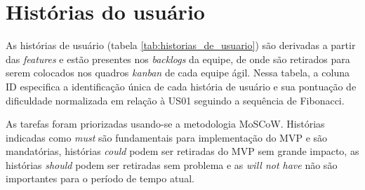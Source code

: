 \documentclass[
	12pt,				%
	oneside,			%
	a4paper,			%
	english,			%
	brazil,				%
	]{abntex2}
\begin{document}
\section{Histórias do usuário}
As histórias de usuário (tabela \ref{tab:historias_de_usuario}) são derivadas a partir das \foreignlanguage{english}{\textit{features}} e estão presentes nos \foreignlanguage{english}{\textit{backlogs}} da equipe, de onde são retirados para serem colocados nos quadros \textit{kanban} de cada equipe ágil. Nessa tabela, a coluna ID especifica a identificação única de cada história de usuário e sua pontuação de dificuldade normalizada em relação à US01 seguindo a sequência de Fibonacci.

As tarefas foram priorizadas usando-se a metodologia MoSCoW. Histórias indicadas como \textit{must} são fundamentais para implementação do MVP e são mandatórias, histórias \textit{could} podem ser retiradas do MVP sem grande impacto, as histórias \textit{should} podem ser retiradas sem problema e as \textit{will not have} não são importantes para o período de tempo atual.
\end{document}
